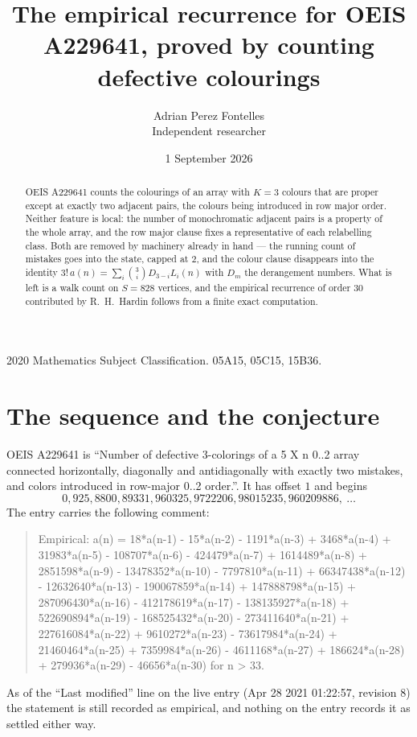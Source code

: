 \documentclass[11pt,a4paper]{article}
\title{The empirical recurrence for OEIS A229641, proved by counting defective colourings}
\author{Adrian Perez Fontelles\\ \small Independent researcher}
\date{1 September 2026}
\theoremstyle{plain}
\theoremstyle{definition}
\begin{document}
\maketitle

\begin{abstract}
OEIS A229641 counts the colourings of an array with $K=3$ colours that are proper except at
exactly two adjacent pairs, the colours being introduced in row
major order. Neither feature is local: the number of monochromatic adjacent pairs is a
property of the whole array, and the row major clause fixes a representative of each
relabelling class. Both are removed by machinery already in hand --- the running count of
mistakes goes into the state, capped at $2$, and the colour clause disappears into the
identity $3!\,a(n)=\sum_i\binom{3}{i}D_{3-i}L_i(n)$ with $D_m$ the derangement
numbers. What is left is a walk count on $S=828$ vertices, and the empirical recurrence of
order $30$ contributed by R.~H.~Hardin follows from a finite exact computation.
\end{abstract}

\noindent\small 2020 Mathematics Subject Classification. 05A15, 05C15, 15B36.\normalsize

\section{The sequence and the conjecture}

OEIS A229641 is ``Number of defective 3-colorings of a 5 X n 0..2 array connected horizontally, diagonally and antidiagonally with exactly two mistakes, and colors introduced in row-major 0..2 order.''. It has offset $1$ and begins
\[
0, 925, 8800, 89331, 960325, 9722206, 98015235, 960209886,\ \dots
\]
The entry carries the following comment:
\begin{quote}\small
Empirical: a(n) = 18*a(n-1) - 15*a(n-2) - 1191*a(n-3) + 3468*a(n-4) + 31983*a(n-5) - 108707*a(n-6) - 424479*a(n-7) + 1614489*a(n-8) + 2851598*a(n-9) - 13478352*a(n-10) - 7797810*a(n-11) + 66347438*a(n-12) - 12632640*a(n-13) - 190067859*a(n-14) + 147888798*a(n-15) + 287096430*a(n-16) - 412178619*a(n-17) - 138135927*a(n-18) + 522690894*a(n-19) - 168525432*a(n-20) - 273411640*a(n-21) + 227616084*a(n-22) + 9610272*a(n-23) - 73617984*a(n-24) + 21460464*a(n-25) + 7359984*a(n-26) - 4611168*a(n-27) + 186624*a(n-28) + 279936*a(n-29) - 46656*a(n-30) for n > 33.
\end{quote}
As of the ``Last modified'' line on the live entry (Apr 28 2021 01:22:57, revision 8) the statement is
still recorded as empirical, and nothing on the entry records it as settled either way.
\end{document}
